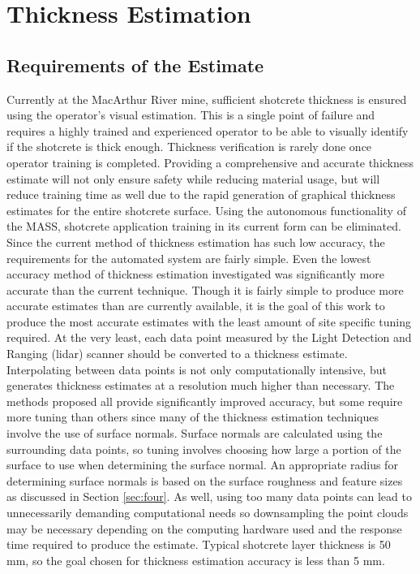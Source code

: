 \chapter{Thickness Estimation}
\label{chap:thick}
\section{Requirements of the Estimate}
Currently at the MacArthur River mine, sufficient shotcrete thickness is ensured using the operator's visual estimation. This is a single point of failure and requires a highly trained and experienced operator to be able to visually identify if the shotcrete is thick enough. Thickness verification is rarely done once operator training is completed. Providing a comprehensive and accurate thickness estimate will not only ensure safety while reducing material usage, but will reduce training time as well due to the rapid generation of graphical thickness estimates for the entire shotcrete surface. Using the autonomous functionality of the MASS, shotcrete application training in its current form can be eliminated.\\

Since the current method of thickness estimation has such low accuracy, the requirements for the automated system are fairly simple. Even the lowest accuracy method of thickness estimation investigated was significantly more accurate than the current technique. Though it is fairly simple to produce more accurate estimates than are currently available, it is the goal of this work to produce the most accurate estimates with the least amount of site specific tuning required. At the very least, each data point measured by the Light Detection and Ranging (\acrshort{lidar}) scanner should be converted to a thickness estimate. Interpolating between data points is not only computationally intensive, but generates thickness estimates at a resolution much higher than necessary. The methods proposed all provide significantly improved accuracy, but some require more tuning than others since many of the thickness estimation techniques involve the use of surface normals. Surface normals are calculated using the surrounding data points, so tuning involves choosing how large a portion of the surface to use when determining the surface normal. An appropriate radius for determining surface normals is based on the surface roughness and feature sizes as discussed in Section \ref{sec:four}. As well, using too many data points can lead to unnecessarily demanding computational needs so downsampling the point clouds may be necessary depending on the computing hardware used and the response time required to produce the estimate. Typical shotcrete layer thickness is 50 mm, so the goal chosen for thickness estimation accuracy is less than 5 mm.\\

